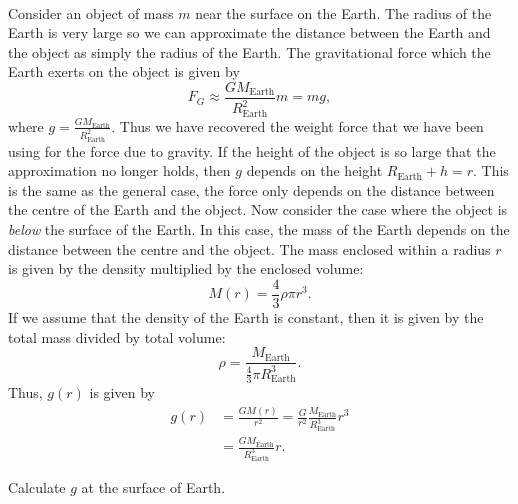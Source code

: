 \documentclass[../classical_mechanics.tex]{subfiles}
\begin{document}
        \paragraph{}
        Consider an object of mass $m$ near the surface on the Earth.
        The radius of the Earth is very large so we can approximate the distance between the Earth and the object as simply the radius of the Earth.
        The gravitational force which the Earth exerts on the object is given by
        \begin{equation}
            F_G\approx\frac{GM_\text{Earth}}{R_\text{Earth}^2}m=mg,
        \end{equation}
        where $g=\frac{GM_\text{Earth}}{R_\text{Earth}^2}$.
        Thus we have recovered the weight force that we have been using for the force due to gravity.
        If the height of the object is so large that the approximation no longer holds, then $g$ depends on the height $R_\text{Earth}+h=r$.
        This is the same as the general case, the force only depends on the distance between the centre of the Earth and the object.
        Now consider the case where the object is \textit{below} the surface of the Earth.
        In this case, the mass of the Earth depends on the distance between the centre and the object.
        The mass enclosed within a radius $r$ is given by the density multiplied by the enclosed volume:
        \begin{equation}
            M(r)=\frac{4}{3}\rho\pi r^3.
        \end{equation}
        If we assume that the density of the Earth is constant, then it is given by the total mass divided by total volume:
        \begin{equation}
            \rho=\frac{M_\text{Earth}}{\frac{4}{3}\pi R_\text{Earth}^3}.
        \end{equation}
        Thus, $g(r)$ is given by
        \begin{align}
            g(r)&=\frac{GM(r)}{r^2}=\frac{G}{r^2}\frac{M_\text{Earth}}{R_\text{Earth}^3}r^3\\
            &=\frac{GM_\text{Earth}}{R_\text{Earth}^3}r.
        \end{align}
        \begin{example}
            Calculate $g$ at the surface of Earth.
        \end{example}
        
\end{document}
